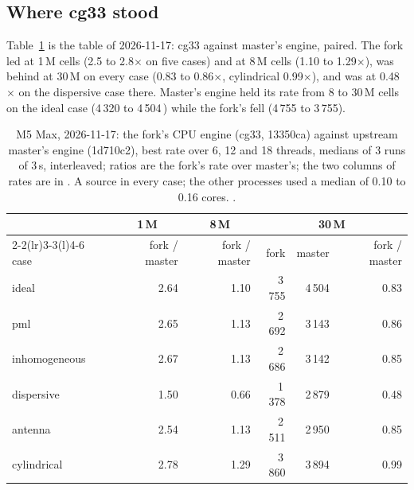 \subsection{Where cg33 stood}
Table~\ref{tab:largebefore} is the table of 2026-11-17: cg33 against master's  engine, paired. The fork led
at 1\,M cells (2.5 to 2.8$\times$ on five cases) and at 8\,M cells (1.10 to 1.29$\times$), was behind at 30\,M on every case
(0.83 to 0.86$\times$, cylindrical 0.99$\times$), and was at 0.48$\times$ on the dispersive case there. Master's 
engine held its rate from 8 to 30\,M cells on the ideal case (4\,320 to 4\,504\,\MC) while the fork's fell (4\,755 to 3\,755).

\begin{table}[H]\centering\small
\begin{tabular}{@{}lrrrrr@{}}
\toprule
 & \multicolumn{1}{c}{1\,M} & \multicolumn{1}{c}{8\,M} & \multicolumn{3}{c}{30\,M} \\
\cmidrule(lr){2-2}\cmidrule(lr){3-3}\cmidrule(l){4-6}
case & fork / master & fork / master & fork & master & fork / master \\
\midrule
ideal & 2.64 & 1.10 & 3\,755 & 4\,504 & 0.83 \\
pml & 2.65 & 1.13 & 2\,692 & 3\,143 & 0.86 \\
inhomogeneous & 2.67 & 1.13 & 2\,686 & 3\,142 & 0.85 \\
dispersive & 1.50 & 0.66 & 1\,378 & 2\,879 & 0.48 \\
antenna & 2.54 & 1.13 & 2\,511 & 2\,950 & 0.85 \\
cylindrical & 2.78 & 1.29 & 3\,860 & 3\,894 & 0.99 \\
\bottomrule
\end{tabular}
\caption{M5 Max, 2026-11-17: the fork's CPU engine (cg33, 13350ca) against upstream master's  engine (1d710c2),
best rate over 6, 12 and 18 threads, medians of 3 runs of 3\,s, interleaved; ratios are the fork's rate over master's; the
two columns of rates are in \MC. A source in every case; the other processes used a median of 0.10 to 0.16 cores.
.}\label{tab:largebefore}
\end{table}

